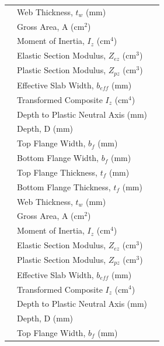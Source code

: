 \documentclass[12pt,a4paper]{report}
\numberwithin{table}{chapter}
\numberwithin{figure}{chapter}
\begin{document}
\begin{longtable}{|C{2.5cm}|L{8.0cm}|>{\centering\arraybackslash}p{5.0cm}|}
 & \textnormal{Web Thickness, $t_w$ (mm)} &  \\[6pt]
 & \textnormal{Gross Area, A (cm$^2$)} &  \\[6pt]
 & \textnormal{Moment of Inertia, $I_z$ (cm$^4$)} &  \\[6pt]
 & \textnormal{Elastic Section Modulus, $Z_{ez}$ (cm$^3$)} &  \\[6pt]
 & \textnormal{Plastic Section Modulus, $Z_{pz}$ (cm$^3$)} &  \\[6pt]
 & \textnormal{Effective Slab Width, $b_{eff}$ (mm)} &  \\[6pt]
 & \textnormal{Transformed Composite $I_z$ (cm$^4$)} &  \\[6pt]
 & \textnormal{Depth to Plastic Neutral Axis (mm)} &  \\[6pt]
\hline
{} & \textnormal{Depth, D (mm)} &  \\[6pt]
 & \textnormal{Top Flange Width, $b_f$ (mm)} &  \\[6pt]
 & \textnormal{Bottom Flange Width, $b_f$ (mm)} &  \\[6pt]
 & \textnormal{Top Flange Thickness, $t_f$ (mm)} &  \\[6pt]
 & \textnormal{Bottom Flange Thickness, $t_f$ (mm)} &  \\[6pt]
 & \textnormal{Web Thickness, $t_w$ (mm)} &  \\[6pt]
 & \textnormal{Gross Area, A (cm$^2$)} &  \\[6pt]
 & \textnormal{Moment of Inertia, $I_z$ (cm$^4$)} &  \\[6pt]
 & \textnormal{Elastic Section Modulus, $Z_{ez}$ (cm$^3$)} &  \\[6pt]
 & \textnormal{Plastic Section Modulus, $Z_{pz}$ (cm$^3$)} &  \\[6pt]
 & \textnormal{Effective Slab Width, $b_{eff}$ (mm)} &  \\[6pt]
 & \textnormal{Transformed Composite $I_z$ (cm$^4$)} &  \\[6pt]
 & \textnormal{Depth to Plastic Neutral Axis (mm)} &  \\[6pt]
\hline
{} & \textnormal{Depth, D (mm)} &  \\[6pt]
 & \textnormal{Top Flange Width, $b_f$ (mm)} &  \\[6pt]

\end{longtable}
\end{document}
